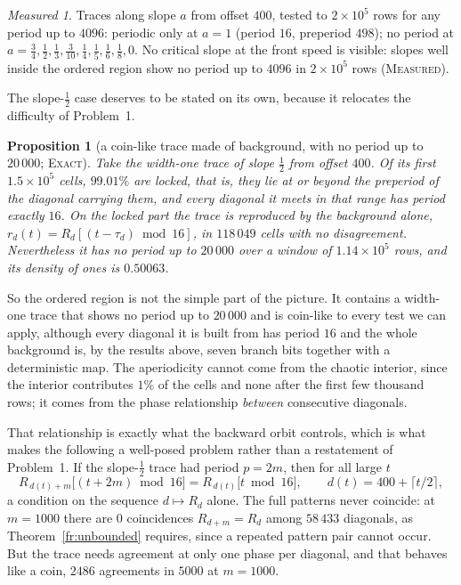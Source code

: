 \documentclass[11pt]{article}
\newtheorem{proposition}[theorem]{Proposition}
\theoremstyle{definition}
\theoremstyle{remark}
\newtheorem*{measured}{Measured}
\newcommand{\EXACT}{\textsc{Exact}}
\newcommand{\MEASURED}{\textsc{Measured}}
\begin{document}
\begin{measured}
Traces along slope $a$ from offset $400$, tested to $2\times10^{5}$ rows for any period up to $4096$:
periodic only at $a=1$ (period $16$, preperiod $498$); no period at
$a=\tfrac34,\tfrac12,\tfrac13,\tfrac3{10},\tfrac14,\tfrac15,\tfrac16,\tfrac18,0$. No critical slope at
the front speed is visible: slopes well inside the ordered region show no period up to $4096$ in $2\times10^{5}$
rows (\MEASURED).
\end{measured}

The slope-$\tfrac12$ case deserves to be stated on its own, because it relocates the difficulty of
Problem~1.

\begin{proposition}[a coin-like trace made of background, with no period up to $20\,000$; \EXACT]\label{fr:wallcoin}
Take the width-one trace of slope $\tfrac12$ from offset $400$. Of its first $1.5\times10^{5}$ cells,
$99.01\%$ are locked, that is, they lie at or beyond the preperiod of the diagonal carrying them, and
every diagonal it meets in that range has period exactly $16$. On the locked part the trace is
reproduced by the background alone, $r_d(t)=R_d[(t-\tau_d)\bmod16]$, in $118\,049$ cells with no
disagreement. Nevertheless it has no period up to $20\,000$ over a window of $1.14\times10^{5}$ rows,
and its density of ones is $0.50063$.
\end{proposition}

So the ordered region is not the simple part of the picture. It contains a width-one trace that shows
no period up to $20\,000$ and is coin-like to every test we can apply, although every diagonal it is built from has period
$16$ and the whole background is, by the results above, seven branch bits together with a deterministic
map. The aperiodicity cannot come from the chaotic interior, since the interior contributes $1\%$ of the
cells and none after the first few thousand rows; it comes from the phase relationship \emph{between}
consecutive diagonals.

That relationship is exactly what the backward orbit controls, which is what makes the following a
well-posed problem rather than a restatement of Problem~1. If the slope-$\tfrac12$ trace had period
$p=2m$, then for all large $t$
\[
  R_{\,d(t)+m}\bigl[(t+2m)\bmod16\bigr]=R_{\,d(t)}\bigl[t\bmod16\bigr],
  \qquad d(t)=400+\lceil t/2\rceil ,
\]
a condition on the sequence $d\mapsto R_d$ alone. The full patterns never coincide: at $m=1000$ there
are $0$ coincidences $R_{d+m}=R_d$ among $58\,433$ diagonals, as Theorem~\ref{fr:unbounded} requires,
since a repeated pattern pair cannot occur. But the trace needs agreement at only one phase per
diagonal, and that behaves like a coin, $2486$ agreements in $5000$ at $m=1000$.
\end{document}
